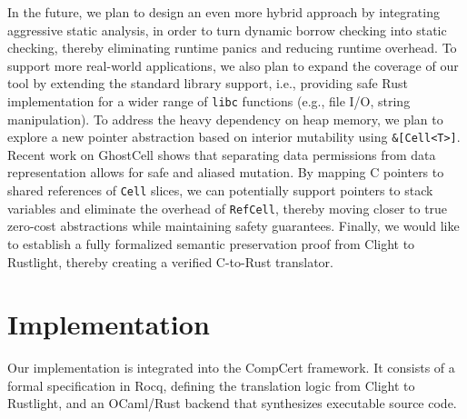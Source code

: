\documentclass{llncs} %
\begin{document}
In the future, we plan to design an even more hybrid approach by integrating aggressive static analysis, in order to turn dynamic borrow checking into static checking, thereby eliminating runtime panics and reducing runtime overhead. To support more real-world applications, we also plan to expand the coverage of our tool by extending the standard library support, i.e., providing safe Rust implementation for a wider range of \texttt{libc} functions (e.g., file I/O, string manipulation). To address the heavy dependency on heap memory, we plan to explore a new pointer abstraction based on interior mutability using \texttt{\&[Cell<T>]}. Recent work on GhostCell \cite{Yanovski2021} shows that separating data permissions from data representation allows for safe and aliased mutation. By mapping C pointers to shared references of \texttt{Cell} slices, we can potentially support pointers to stack variables and eliminate the overhead of \texttt{RefCell}, thereby moving closer to true zero-cost abstractions while maintaining safety guarantees.
%
Finally, we would like to establish a fully formalized semantic preservation proof from Clight to Rustlight, thereby creating a verified C-to-Rust translator.



\newpage %
\appendix

\section{Implementation}
\label{sec:impl}

Our implementation is integrated into the CompCert framework. It consists of a formal specification in Rocq, defining the translation logic from Clight to Rustlight, and an OCaml/Rust backend that synthesizes executable source code. 


\end{document}
